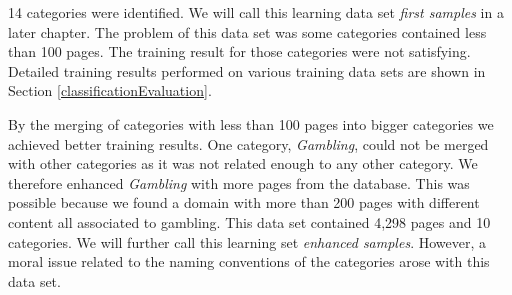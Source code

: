 14 categories were identified. We will call this learning data set \textit{first samples} in a later chapter. The problem of this data set was some categories contained less than 100 pages. The training result for those categories were not satisfying. Detailed training results performed on various training data sets are shown in Section \ref{classificationEvaluation}. 

By the merging of categories with less than 100 pages into bigger categories we achieved better training results. One category, \textit{Gambling}, could not be merged with other categories as it was not related enough to any other category. We therefore enhanced \textit{Gambling} with more pages from the database. This was possible because we found a domain with more than 200 pages with different content all associated to gambling. This data set contained 4,298 pages and 10 categories. We will further call this learning set \textit{enhanced samples}. However, a moral issue related to the naming conventions of the categories arose with this data set. 

